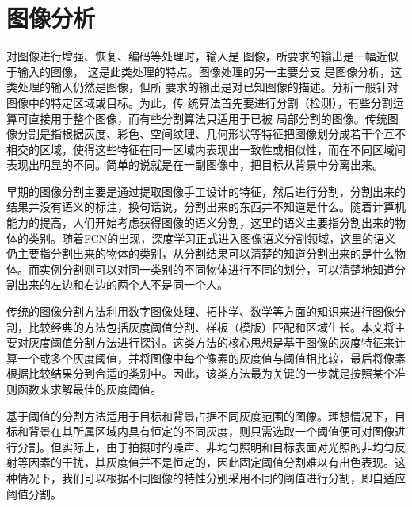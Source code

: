 \section{图像分析}
\label{sec:image_analysis}

对图像进行增强、恢复、编码等处理时，输入是 图像，所要求的输出是一幅近似于输入的图像， 这是此类处理的特点。图像处理的另一主要分支 是图像分析，这类处理的输入仍然是图像，但所 要求的输出是对已知图像的描述。分析一般针对图像中的特定区域或目标。为此，传 统算法首先要进行分割（检测），有些分割运算可直接用于整个图像，而有些分割算法只适用于已被 局部分割的图像。传统图像分割是指根据灰度、彩色、空间纹理、几何形状等特征把图像划分成若干个互不相交的区域，使得这些特征在同一区域内表现出一致性或相似性，而在不同区域间表现出明显的不同。简单的说就是在一副图像中，把目标从背景中分离出来。

早期的图像分割主要是通过提取图像手工设计的特征，然后进行分割，分割出来的结果并没有语义的标注，换句话说，分割出来的东西并不知道是什么。随着计算机能力的提高，人们开始考虑获得图像的语义分割，这里的语义主要指分割出来的物体的类别。随着FCN的出现，深度学习正式进入图像语义分割领域，这里的语义仍主要指分割出来的物体的类别，从分割结果可以清楚的知道分割出来的是什么物体。而实例分割则可以对同一类别的不同物体进行不同的划分，可以清楚地知道分割出来的左边和右边的两个人不是同一个人。

传统的图像分割方法利用数字图像处理、拓扑学、数学等方面的知识来进行图像分割，比较经典的方法包括灰度阈值分割、样板（模版）匹配和区域生长。本文将主要对灰度阈值分割方法进行探讨。这类方法的核心思想是基于图像的灰度特征来计算一个或多个灰度阈值，并将图像中每个像素的灰度值与阈值相比较，最后将像素根据比较结果分到合适的类别中。因此，该类方法最为关键的一步就是按照某个准则函数来求解最佳的灰度阈值。

基于阈值的分割方法适用于目标和背景占据不同灰度范围的图像。理想情况下，目标和背景在其所属区域内具有恒定的不同灰度，则只需选取一个阈值便可对图像进行分割。但实际上，由于拍摄时的噪声、非均匀照明和目标表面对光照的非均匀反射等因素的干扰，其灰度值并不是恒定的，因此固定阈值分割难以有出色表现。这种情况下，我们可以根据不同图像的特性分别采用不同的阈值进行分割，即自适应阈值分割。

